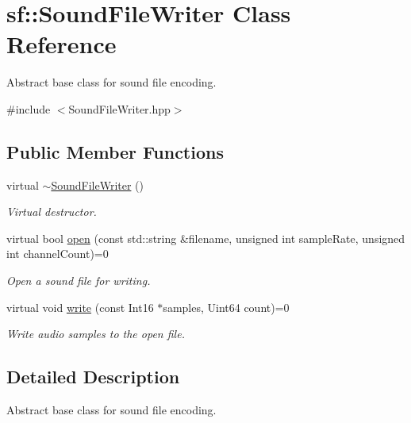 \hypertarget{classsf_1_1_sound_file_writer}{}\section{sf\+:\+:Sound\+File\+Writer Class Reference}
\label{classsf_1_1_sound_file_writer}


Abstract base class for sound file encoding.  




{\ttfamily \#include $<$Sound\+File\+Writer.\+hpp$>$}

\subsection*{Public Member Functions}
\begin{DoxyCompactItemize}
\item 
\mbox{\label{classsf_1_1_sound_file_writer_a76944fc158688f35050bd5b592c90270}} 
virtual \hyperlink{classsf_1_1_sound_file_writer_a76944fc158688f35050bd5b592c90270}{$\sim$\+Sound\+File\+Writer} ()
\begin{DoxyCompactList}\small\item\em Virtual destructor. \end{DoxyCompactList}\item 
virtual bool \hyperlink{classsf_1_1_sound_file_writer_a5c92bcaaa880ef4d3eaab18dae1d3d07}{open} (const std\+::string \&filename, unsigned int sample\+Rate, unsigned int channel\+Count)=0
\begin{DoxyCompactList}\small\item\em Open a sound file for writing. \end{DoxyCompactList}\item 
virtual void \hyperlink{classsf_1_1_sound_file_writer_a4ce597e7682d22c5b2c98d77e931a1da}{write} (const Int16 $\ast$samples, Uint64 count)=0
\begin{DoxyCompactList}\small\item\em Write audio samples to the open file. \end{DoxyCompactList}\end{DoxyCompactItemize}


\subsection{Detailed Description}
Abstract base class for sound file encoding. 

